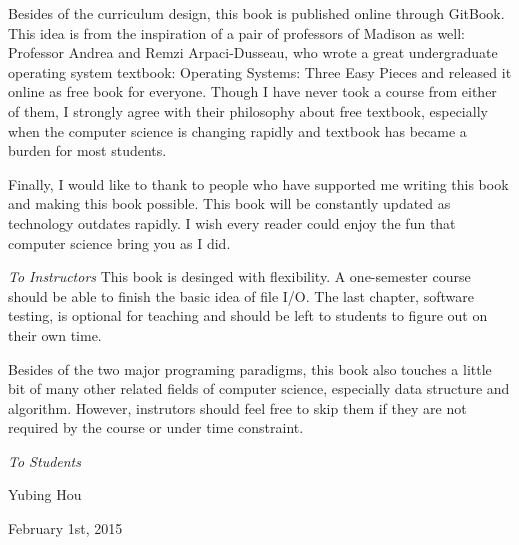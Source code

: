 \documentclass[../main.tex]{subfiles}
\begin{document}
    \par Besides of the curriculum design, this book is published online through GitBook.
    This idea is from the inspiration of a pair of professors of Madison as well:
    Professor Andrea and Remzi Arpaci-Dusseau, who wrote a great undergraduate
    operating system textbook: Operating Systems: Three Easy Pieces
    and released it online as free book for everyone. Though I have never took a
    course from either of them, I strongly agree with their philosophy about free
    textbook, especially when the computer science is changing rapidly and textbook
    has became a burden for most students.

    \par Finally, I would like to thank to people who have supported me writing this book
    and making this book possible. This book will be constantly updated as
    technology outdates rapidly. I wish every reader could enjoy the fun that
    computer science bring you as I did.

    \emph{To Instructors}
    This book is desinged with flexibility. A one-semester course should be able
    to finish the basic idea of file I/O. The last chapter, software testing, is
    optional for teaching and should be left to students to figure out on their
    own time.

    Besides of the two major programing paradigms, this book also touches a little
    bit of many other related fields of computer science, especially data structure
    and algorithm. However, instrutors should feel free to skip them if they are
    not required by the course or under time constraint.

    \emph{To Students}



    \par Yubing Hou
    \par February 1st, 2015
\end{document}

